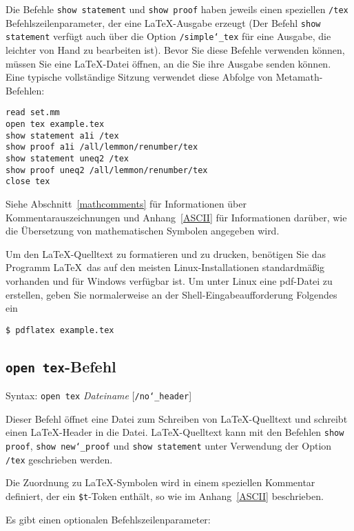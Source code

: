Die Befehle \texttt{show statement} und \texttt{show proof} haben jeweils einen spe\-zi\-el\-len \texttt{/tex} Befehlszeilenparameter, der eine \LaTeX-Ausgabe erzeugt (Der Befehl \texttt{show statement} verfügt auch über die Option \texttt{/simple{\char`\_}tex} für eine Ausgabe, die leichter von Hand zu bearbeiten ist).  Bevor Sie diese Befehle verwenden können, müssen Sie eine \LaTeX-Datei öffnen, an die Sie ihre Ausgabe senden können.  Eine typische vollständige Sitzung verwendet diese Abfolge von Metamath-Befehlen:

\begin{verbatim}
read set.mm
open tex example.tex
show statement a1i /tex
show proof a1i /all/lemmon/renumber/tex
show statement uneq2 /tex
show proof uneq2 /all/lemmon/renumber/tex
close tex
\end{verbatim}

Siehe Abschnitt~\ref{mathcomments} für Informationen über Kommentarauszeichnungen und Anhang~\ref{ASCII} für Informationen darüber, wie die Übersetzung von mathematischen Symbolen angegeben wird.

Um den \LaTeX-Quelltext zu formatieren und zu drucken, benötigen Sie das Programm \LaTeX\, das auf den meisten Linux-Installationen standardmäßig vorhanden und für Windows verfügbar ist.  Um unter Linux eine pdf-Datei zu erstellen, geben Sie normalerweise an der Shell-Eingabeaufforderung Folgendes ein
\begin{verbatim}
$ pdflatex example.tex
\end{verbatim}

\subsection{\texttt{open tex}-Befehl}

Syntax:  \texttt{open tex} {\em Dateiname} [\texttt{/no{\char`\_}header}]

Dieser Befehl öffnet eine Datei zum Schreiben von \LaTeX-Quelltext und schreibt einen \LaTeX-Header in die Datei. \LaTeX-Quelltext kann mit den Befehlen \texttt{show proof}, \texttt{show new{\char`\_}proof} und \texttt{show statement} unter Verwendung der Option \texttt{/tex} geschrieben werden.

Die Zuordnung zu \LaTeX-Symbolen wird in einem speziellen Kommentar definiert, der ein \texttt{\$t}-Token enthält, so wie im Anhang~\ref{ASCII} beschrieben.

Es gibt einen optionalen Befehlszeilenparameter:

